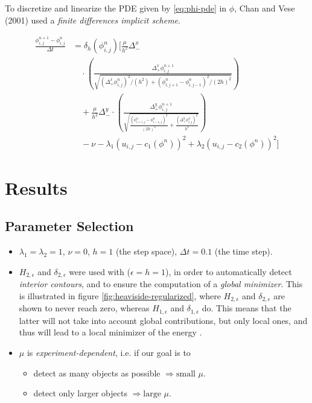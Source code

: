 \documentclass[journal]{IEEEtran}
\begin{document}
To discretize and linearize the PDE given by \eqref{eq:phi-pde} in $\phi$, Chan and Vese (2001) used a \emph{finite differences implicit scheme}.

\small
\begin{align*}
    \frac{\phi_{i,j}^{n+1} - \phi_{i,j}^n}{\Delta t}
     & = \delta_h(\phi_{i,j}^n) \Bigg[ \frac{\mu}{h^2} \Delta_-^x                                                                                   \\
     & \quad \cdot \left(
    \frac{\Delta_+^x \phi_{i,j}^{n+1}}{\sqrt{(\Delta_+^x \phi_{i,j}^n)^2 / (h^2) + (\phi_{i,j+1}^n - \phi_{i,j-1}^n)^2 / (2h)^2}} \right)           \\
     & \quad + \frac{\mu}{h^2} \Delta_-^y \cdot \left(
    \frac{\Delta_+^y \phi_{i,j}^{n+1}}{\sqrt{\frac{(\phi_{i+1,j}^n - \phi_{i-1,j}^n)^2}{(2h)^2} + \frac{(\Delta_+^y \phi_{i,j}^n)^2}{h^2}}} \right) \\
     & \quad - \nu - \lambda_1 (u_{i,j} - c_1(\phi^n))^2 + \lambda_2 (u_{i,j} - c_2(\phi^n))^2 \Bigg]
\end{align*}
\normalsize

\section{Results}

\subsection{Parameter Selection}\label{sec:parameter-selection}
\begin{itemize}
    \item \( \lambda_1 = \lambda_2 = 1 \), \( \nu = 0 \), \( h = 1 \) (the step space), \( \Delta t = 0.1 \) (the time step).
    \item \( H_{2,\epsilon} \) and \( \delta_{2,\epsilon} \) were used with (\( \epsilon = h = 1 \)), in order to automatically detect \emph{interior contours}, and to ensure the computation of a \emph{global minimizer}. This is illustrated in figure \ref{fig:heaviside-regularized}, where \( H_{2,\epsilon} \) and \( \delta_{2,\epsilon} \) are shown to never reach zero, whereas \( H_{1,\epsilon} \) and \( \delta_{1,\epsilon} \) do. This means that the latter will not take into account global contributions, but only local ones, and thus will lead to a local minimizer of the energy \cite{ChanVese}.
    \item $\mu$ is \emph{experiment-dependent}, i.e. if our goal is to
          \begin{itemize}
              \item detect as many objects as possible $\Longrightarrow \text{small} \, \, \mu$.
              \item detect only larger objects $\Longrightarrow \text{large} \, \, \mu$.
          \end{itemize}
\end{itemize}
\end{document}
